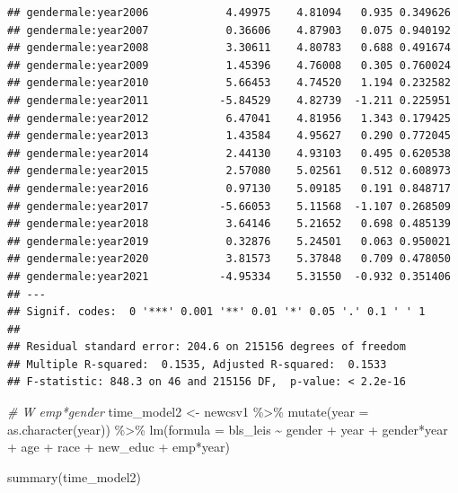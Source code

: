 \documentclass[
]{article}
\newenvironment{Shaded}{\begin{snugshade}}{\end{snugshade}}
\newcommand{\AttributeTok}[1]{\textcolor[rgb]{0.77,0.63,0.00}{#1}}
\newcommand{\CommentTok}[1]{\textcolor[rgb]{0.56,0.35,0.01}{\textit{#1}}}
\newcommand{\FunctionTok}[1]{\textcolor[rgb]{0.00,0.00,0.00}{#1}}
\newcommand{\NormalTok}[1]{#1}
\newcommand{\OtherTok}[1]{\textcolor[rgb]{0.56,0.35,0.01}{#1}}
\newcommand{\SpecialCharTok}[1]{\textcolor[rgb]{0.00,0.00,0.00}{#1}}
\begin{document}
\begin{verbatim}
## gendermale:year2006            4.49975    4.81094   0.935 0.349626    
## gendermale:year2007            0.36606    4.87903   0.075 0.940192    
## gendermale:year2008            3.30611    4.80783   0.688 0.491674    
## gendermale:year2009            1.45396    4.76008   0.305 0.760024    
## gendermale:year2010            5.66453    4.74520   1.194 0.232582    
## gendermale:year2011           -5.84529    4.82739  -1.211 0.225951    
## gendermale:year2012            6.47041    4.81956   1.343 0.179425    
## gendermale:year2013            1.43584    4.95627   0.290 0.772045    
## gendermale:year2014            2.44130    4.93103   0.495 0.620538    
## gendermale:year2015            2.57080    5.02561   0.512 0.608973    
## gendermale:year2016            0.97130    5.09185   0.191 0.848717    
## gendermale:year2017           -5.66053    5.11568  -1.107 0.268509    
## gendermale:year2018            3.64146    5.21652   0.698 0.485139    
## gendermale:year2019            0.32876    5.24501   0.063 0.950021    
## gendermale:year2020            3.81573    5.37848   0.709 0.478050    
## gendermale:year2021           -4.95334    5.31550  -0.932 0.351406    
## ---
## Signif. codes:  0 '***' 0.001 '**' 0.01 '*' 0.05 '.' 0.1 ' ' 1
## 
## Residual standard error: 204.6 on 215156 degrees of freedom
## Multiple R-squared:  0.1535, Adjusted R-squared:  0.1533 
## F-statistic: 848.3 on 46 and 215156 DF,  p-value: < 2.2e-16
\end{verbatim}

\begin{Shaded}
\begin{Highlighting}[]
\CommentTok{\# W emp*gender}
\NormalTok{time\_model2 }\OtherTok{\textless{}{-}}\NormalTok{ newcsv1 }\SpecialCharTok{\%\textgreater{}\%}
  \FunctionTok{mutate}\NormalTok{(}\AttributeTok{year =} \FunctionTok{as.character}\NormalTok{(year)) }\SpecialCharTok{\%\textgreater{}\%}
  \FunctionTok{lm}\NormalTok{(}\AttributeTok{formula =}\NormalTok{ bls\_leis }\SpecialCharTok{\textasciitilde{}}\NormalTok{ gender }\SpecialCharTok{+}\NormalTok{ year }\SpecialCharTok{+}\NormalTok{ gender}\SpecialCharTok{*}\NormalTok{year }\SpecialCharTok{+}\NormalTok{ age }\SpecialCharTok{+}\NormalTok{ race }\SpecialCharTok{+}\NormalTok{ new\_educ }\SpecialCharTok{+}\NormalTok{ emp}\SpecialCharTok{*}\NormalTok{year) }

\FunctionTok{summary}\NormalTok{(time\_model2)}
\end{Highlighting}
\end{Shaded}
\end{document}

